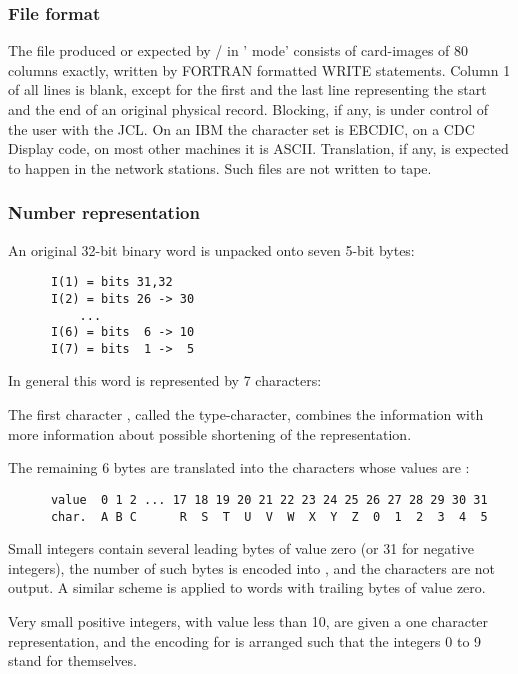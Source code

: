 \subsubsection*{File format}

The file produced or expected by / 
in ' mode' consists
of card-images of 80 columns exactly, written by FORTRAN formatted
WRITE statements.
Column 1 of all lines is blank,
except for the first and the last line representing
the start and the end of an original physical record.
Blocking, if any, is under control of the user with the JCL.
On an IBM the character set is EBCDIC,
on a CDC Display code, on most other machines it is ASCII.
Translation, if any, is expected to happen in the network
stations.
Such files are not written to tape.

\subsubsection*{Number representation}

An original 32-bit binary word is unpacked onto seven 5-bit bytes:

\begin{verbatim}
      I(1) = bits 31,32
      I(2) = bits 26 -> 30
          ...
      I(6) = bits  6 -> 10
      I(7) = bits  1 ->  5
\end{verbatim}

In general this word is represented by 7 characters:

The first character , called the type-character,
combines the information  with more information about possible
shortening of the representation.

The remaining 6 bytes  are translated into the characters 
whose  values are :

\begin{verbatim}
      value  0 1 2 ... 17 18 19 20 21 22 23 24 25 26 27 28 29 30 31
      char.  A B C      R  S  T  U  V  W  X  Y  Z  0  1  2  3  4  5
\end{verbatim}


Small integers contain several leading bytes of value zero
(or 31 for negative integers),
the number  of such bytes is encoded into ,
and the characters  are not output.
A similar scheme is applied to words with trailing bytes
 of value zero.

Very small positive integers, with value less than 10,
are given a one character representation,
and the encoding for  is arranged such that the integers
0 to 9 stand for themselves.


